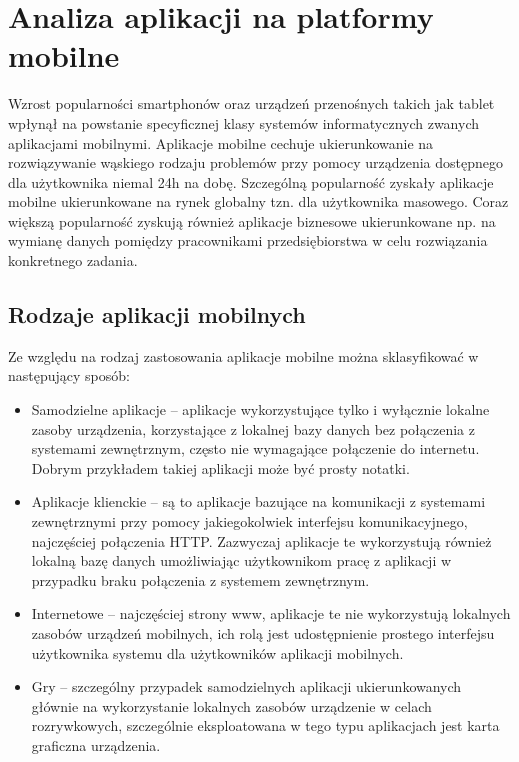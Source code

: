 \chapter{Analiza aplikacji na platformy mobilne}
\label{cha:analizaAplikacjiMobilnych}

Wzrost popularności smartphonów oraz urządzeń przenośnych takich jak tablet wpłynął na powstanie specyficznej klasy systemów informatycznych zwanych aplikacjami mobilnymi. Aplikacje mobilne cechuje ukierunkowanie na rozwiązywanie wąskiego rodzaju problemów przy pomocy urządzenia dostępnego dla użytkownika niemal 24h na dobę. Szczególną popularność zyskały aplikacje mobilne ukierunkowane na rynek globalny tzn. dla użytkownika masowego. Coraz większą popularność zyskują również aplikacje biznesowe ukierunkowane np. na wymianę danych pomiędzy pracownikami przedsiębiorstwa w celu rozwiązania konkretnego zadania. 

\section{Rodzaje aplikacji mobilnych}
\label{sec:rodzajeAplikacjiMobilnych}

Ze względu na rodzaj zastosowania aplikacje mobilne można sklasyfikować w następujący sposób:

\begin{itemize}
\item Samodzielne aplikacje -- aplikacje wykorzystujące tylko i wyłącznie lokalne zasoby urządzenia, korzystające z lokalnej bazy danych bez połączenia z systemami zewnętrznym, często nie wymagające połączenie do internetu. Dobrym przykładem takiej aplikacji może być prosty notatki.  
\item Aplikacje klienckie -- są to aplikacje bazujące na komunikacji z systemami zewnętrznymi przy pomocy jakiegokolwiek interfejsu komunikacyjnego,  najczęściej połączenia HTTP. Zazwyczaj aplikacje te wykorzystują również lokalną bazę danych umożliwiając użytkownikom pracę z aplikacji w przypadku braku połączenia z systemem zewnętrznym.
\item Internetowe -- najczęściej strony www, aplikacje  te nie wykorzystują lokalnych zasobów urządzeń mobilnych, ich rolą jest udostępnienie prostego interfejsu użytkownika systemu dla użytkowników aplikacji mobilnych.
\item Gry  -- szczególny przypadek samodzielnych aplikacji ukierunkowanych głównie na wykorzystanie lokalnych zasobów urządzenie w celach rozrywkowych, szczególnie eksploatowana w tego typu aplikacjach jest karta graficzna urządzenia.
\end{itemize}


